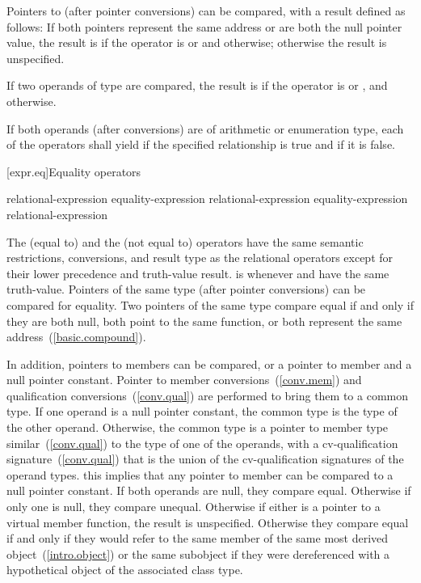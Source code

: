 \pnum
Pointers to  (after pointer conversions) can be compared, with a result
defined as follows: If both pointers represent the same address or are both the null
pointer value, the result is  if the operator is \tcode{<=} or \tcode{>=}
and  otherwise; otherwise the result is unspecified.

\pnum
If two operands of type  are compared, the result is
 if the operator is \tcode{<=} or \tcode{>=}, and 
otherwise.

\pnum
If both operands (after conversions) are of arithmetic or enumeration type, each
of the operators shall yield  if the specified relationship is true
and  if it is false.

[expr.eq]{Equality operators}%
%
%

\begin{bnf}
\br
    relational-expression\br
    equality-expression \terminal{==} relational-expression\br
    equality-expression \terminal{!=} relational-expression
\end{bnf}

\pnum
The \tcode{==} (equal to) and the \tcode{!=} (not equal to) operators
have the same semantic restrictions, conversions, and result type as the
relational operators except for their lower precedence and truth-value
result.
\enternote 
{} is  whenever  and 
have the same truth-value.
\exitnote 
{}%
%
Pointers of the same type (after pointer
conversions) can be compared for equality. Two pointers of the same type
compare equal if and only if they are both null, both point to the same
%
function, or both represent the same address~(\ref{basic.compound}).

\pnum
In addition, pointers to members can be compared, or a pointer to member
and a null pointer constant. Pointer to member
conversions~(\ref{conv.mem}) and qualification
conversions~(\ref{conv.qual}) are performed to bring them to a common
type. If one operand is a null pointer constant, the common type is the
type of the other operand. Otherwise, the common type is a pointer to
member type similar~(\ref{conv.qual}) to the type of one of the
operands, with a cv-qualification signature~(\ref{conv.qual}) that is
the union of the cv-qualification signatures of the operand types.
\enternote 
this implies that any pointer to member can be compared to a null
pointer constant.
\exitnote 
If both operands are null, they compare equal. Otherwise if only one is
null, they compare unequal. Otherwise if either is a pointer to a
virtual member function, the result is unspecified. Otherwise they
compare equal if and only if they would refer to the same member of the
same most derived object~(\ref{intro.object}) or the same subobject if
they were dereferenced with a hypothetical object of the associated
class type.
\enterexample 

